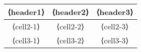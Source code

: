 \documentclass{article}
\begin{document}
    \begin{tabular}{ccc}
        \hline
        ⟨header1⟩ & ⟨header2⟩ & ⟨header3⟩ \\
        \hline
        ⟨cell2-1⟩ & ⟨cell2-2⟩ & ⟨cell2-3⟩ \\
        ⟨cell3-1⟩ & ⟨cell3-2⟩ & ⟨cell3-3⟩ \\
        \hline
    \end{tabular}
\end{document}
